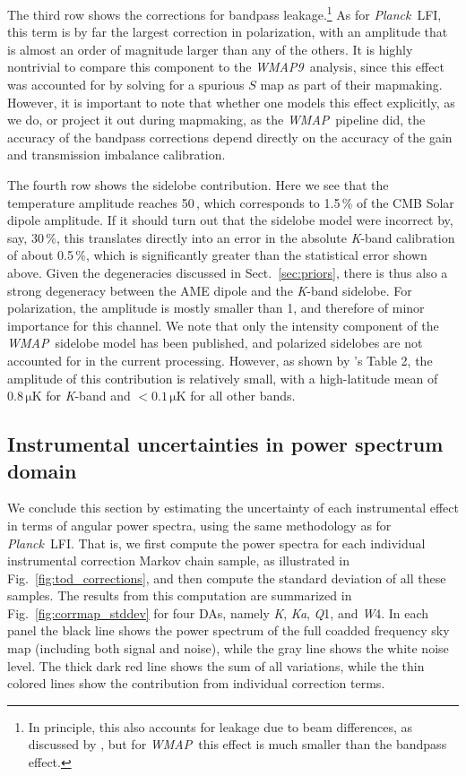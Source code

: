 \documentclass[twocolumn]{../../common/aa}
\def\WMAP{\emph{WMAP}}
\def\WMAPnine{\emph{WMAP9}}
\def\Planck{\emph{Planck}}
\newcommand{\K}[0]{\textit K}
\newcommand{\Ka}[0]{\textit{Ka}}
\newcommand{\Q}[0]{\textit Q}
\newcommand{\W}[0]{\textit W}
\begin{document}
The third row shows the corrections for bandpass leakage.\footnote{In principle, this also accounts for leakage due to beam differences, as discussed by \citet{bp09}, but for \WMAP\ this effect is much smaller than the bandpass effect.} As for \Planck\ LFI, this term is by far the largest correction in polarization, with an amplitude that is almost an order of magnitude larger than any of the others. It is highly nontrivial to compare this component to the \WMAPnine\ analysis, since this effect was accounted for by solving for a spurious $S$ map as part of their mapmaking. However, it is important to note that whether one models this effect explicitly, as we do, or project it out during mapmaking, as the \WMAP\ pipeline did, the accuracy of the bandpass corrections depend directly on the accuracy of the gain and transmission imbalance calibration.

The fourth row shows the sidelobe contribution. Here we see that the temperature amplitude reaches 50\,\muK, which corresponds to 1.5\,\% of the CMB Solar dipole amplitude. If it should turn out that the sidelobe model were incorrect by, say, 30\,\%, this translates directly into an error in the absolute \K-band calibration of about 0.5\,\%, which is significantly greater than the statistical error shown above. Given the degeneracies discussed in Sect.~\ref{sec:priors}, there is thus also a strong degeneracy between the AME dipole and the \K-band sidelobe. For polarization, the amplitude is mostly smaller than 1\muK, and therefore of minor importance for this channel. We note that only the intensity component of the \WMAP\ sidelobe model has been published, and polarized sidelobes are not accounted for in the current processing. However, as shown by \citet{barnes2003}'s Table 2, the amplitude of this contribution is relatively small, with a high-latitude mean of $0.8\,\mathrm{\mu K}$ for \K-band and $<0.1\,\mathrm{\mu K}$ for all other bands.




\subsection{Instrumental uncertainties in power spectrum domain }

We conclude this section by estimating the uncertainty of each instrumental effect in terms of angular power spectra, using the same methodology as \citet{bp10} for \Planck\ LFI. That is, we first compute the power spectra for each individual instrumental correction Markov chain sample, as illustrated in Fig.~\ref{fig:tod_corrections}, and then compute the standard deviation of all these samples. The results from this computation are summarized in Fig.~\ref{fig:corrmap_stddev} for four DAs, namely \K, \Ka, \Q1, and \W4. In each panel the black line shows the power spectrum of the full coadded frequency sky map (including both signal and noise), while the gray line shows the white noise level. The thick dark red line shows the sum of all variations, while the thin colored lines show the contribution from individual correction terms.
\end{document}
